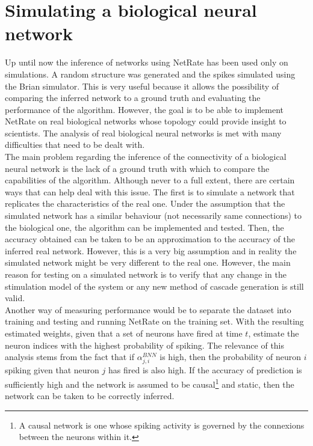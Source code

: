 
\chapter{Simulating a biological neural network}\label{chap:simulating}

Up until now the inference of networks using NetRate has been used only on simulations. A random structure was generated and the spikes simulated using the Brian simulator. This is very useful because it allows the possibility of comparing the inferred network to a ground truth and evaluating the performance of the algorithm. However, the goal is to be able to implement NetRate on real biological networks whose topology could provide insight to scientists. The analysis of real biological neural networks is met with many difficulties that need to be dealt with.\\

The main problem regarding the inference of the connectivity of a biological neural network is the lack of a ground truth with which to compare the capabilities of the algorithm. Although never to a full extent, there are certain ways that can help deal with this issue. The first is to simulate a network that replicates the characteristics of the real one. Under the assumption that the simulated network has a similar behaviour (not necessarily same connections) to the biological one, the algorithm can be implemented and tested. Then, the accuracy obtained can be taken to be an approximation to the accuracy of the inferred real network. However, this is a very big assumption and in reality the simulated network might be very different to the real one. However, the main reason for testing on a simulated network is to verify that any change in the stimulation model of the system or any new method of cascade generation is still valid.\\ %

Another way of measuring performance would be to separate the dataset into training and testing and running NetRate on the training set. With the resulting estimated weights, given that a set of neurons have fired at time \(t\), estimate the neuron indices with the highest probability of spiking. The relevance of this analysis stems from the fact that if \(\alpha_{j,i}^{BNN}\) is high, then the probability of neuron \(i\) spiking given that neuron \(j\) has fired is also high. If the accuracy of prediction is sufficiently high and the network is assumed to be causal\footnote{A causal network is one whose spiking activity is governed by the connexions between the neurons within it.} and static, then the network can be taken to be correctly inferred.\\

